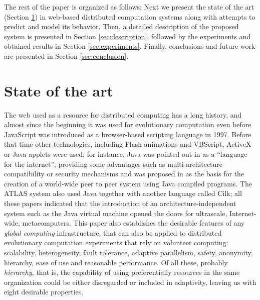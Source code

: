 \documentclass[journal,onecolumn]{IEEEtran}
\begin{document}
The rest of the paper is organized as follows: Next we present the
state of the art (Section \ref{sec:soa}) in web-based distributed 
computation systems along with attempts to predict and model its behavior. %
Then, a detailed description of the proposed system is presented 
in Section \ref{sec:description}, followed by the experiments and 
obtained results in Section \ref{sec:experiments}.
Finally, conclusions and future work are presented in Section \ref{sec:conclusion}. 


\section{State of the art}
\label{sec:soa}

The web used as a resource for distributed computing has a
long history, and almost since the beginning it was used for 
evolutionary computation even before JavaScript was
introduced as a browser-based scripting language in 1997. Before that
time other technologies,
 including Flash animations and VBScript, ActiveX or Java applets were
used; for instance, Java was pointed out in \cite{soares1998get} as a
``language for the
internet'', providing some advantages such as multi-architecture compatibility or 
security mechanisms and was proposed in \cite{chandy1996world} as the
basis for the creation of a world-wide peer to peer system using Java
compiled programs. The ATLAS system
\cite{Baldeschwieler:1996:TIG:504450.504482} also used Java together
with another language called Cilk; all these papers indicated that
the introduction of an architecture-independent system such as the
Java virtual machine opened the doors for ultrascale, Internet-wide,
metacomputers. This paper also establishes the desirable features of
any {\em global computing} infrastructure, that can also be applied to
distributed evolutionary computation experiments that rely on
volunteer computing: scalability, heterogeneity, fault tolerance,
adaptive parallelism, safety, anonymity, hierarchy, ease of use and
reasonable performance. Of all these, probably {\em hierarchy}, that
is, the capability of using preferentially resources in the same
organization could be either disregarded or included in adaptivity,
leaving us with eight desirable properties. 
\end{document}
